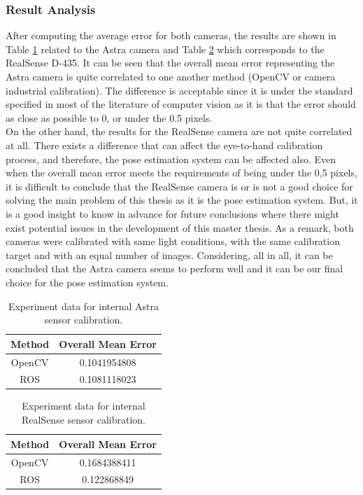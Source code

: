 \subsubsection{Result Analysis}
After computing the average error for both cameras, the results are shown in Table \ref{astra1} related to the Astra camera and Table \ref{real1} which corresponds to the RealSense D-435. It can be seen that the overall mean error representing the Astra camera is quite correlated to one another method (OpenCV or camera \textunderscore industrial calibration). The difference is acceptable since it is under the standard specified in most of the literature of computer vision as it is that the error should as close as possible to 0, or under the 0.5 pixels.\\
On the other hand, the results for the RealSense camera are not quite correlated at all. There exists a difference that can affect the eye-to-hand calibration process, and therefore, the pose estimation system can be affected also. Even when the overall mean error meets the requirements of being under the 0,5 pixels, it is difficult to conclude that the RealSense camera is or is not a good choice for solving the main problem of this thesis as it is the pose estimation system. But, it is a good insight to know in advance for future conclusions where there might exist potential issues in the development of this master thesis.
As a remark, both cameras were calibrated with same light conditions, with the same calibration target and with an equal number of images. Considering, all in all, it can be concluded that the Astra camera seems to perform well and it can be our final choice for the pose estimation system.

\begin{table}[b]
\renewcommand{\arraystretch}{1.3}
\caption{Experiment data for internal Astra sensor calibration.}
\label{astra1}
\centering
\begin{tabular}{|c||c|}
\hline
Method & Overall Mean Error\\
\hline
OpenCV &  0.1041954808\\
\hline
ROS &  0.1081118023\\
\hline
\hline
\end{tabular}
\end{table}

\begin{table}[b]
\renewcommand{\arraystretch}{1.3}
\caption{Experiment data for internal RealSense sensor calibration.}
\label{real1}
\centering
\begin{tabular}{|c||c|}
\hline
Method & Overall Mean Error\\
\hline
OpenCV &  0.1684388411\\
\hline
ROS &  0.122868849\\
\hline
\hline
\end{tabular}
\end{table}

